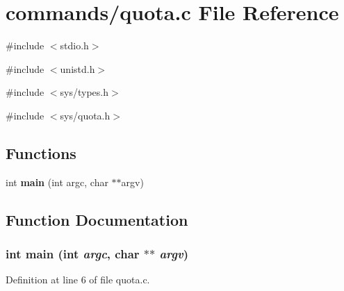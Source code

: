 \section{commands/quota.c File Reference}
\label{quota_8c}
{\ttfamily \#include $<$stdio.h$>$}\par
{\ttfamily \#include $<$unistd.h$>$}\par
{\ttfamily \#include $<$sys/types.h$>$}\par
{\ttfamily \#include $<$sys/quota.h$>$}\par
\subsection*{Functions}
\begin{DoxyCompactItemize}
\item 
int {\bf main} (int argc, char $\ast$$\ast$argv)
\end{DoxyCompactItemize}


\subsection{Function Documentation}
\subsubsection[{main}]{\setlength{\rightskip}{0pt plus 5cm}int main (int {\em argc}, \/  char $\ast$$\ast$ {\em argv})}\label{quota_8c_a3c04138a5bfe5d72780bb7e82a18e627}


Definition at line 6 of file quota.c.

